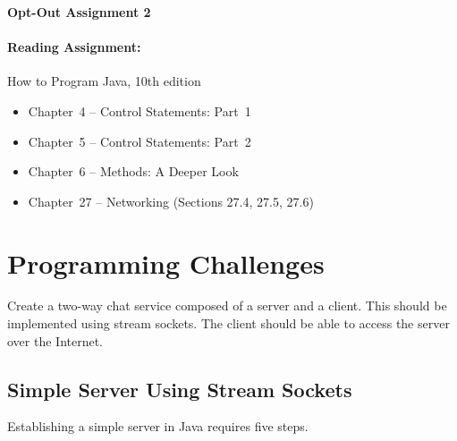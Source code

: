 \documentclass[11pt]{article}
\begin{document}
\begin{center}
{\bfseries \LARGE Opt-Out Assignment 2}
\end{center}

\paragraph{Reading Assignment:}
How to Program Java, 10th edition
\begin{itemize}
\item Chapter~4 -- Control Statements: Part~1
\item Chapter~5 -- Control Statements: Part~2
\item Chapter~6 -- Methods: A Deeper Look
\item Chapter~27 -- Networking (Sections 27.4, 27.5, 27.6)
\end{itemize}


\section*{Programming Challenges}

Create a two-way chat service composed of a server and a client.
This should be implemented using stream sockets.
The client should be able to access the server over the Internet.


\subsection*{Simple Server Using Stream Sockets}

Establishing a simple server in Java requires five steps.
\end{document}
